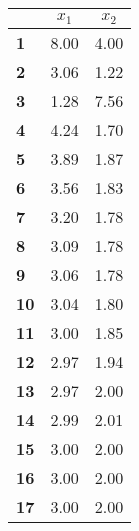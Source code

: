 \begin{small}\begin{tabular}{|l|c|c|}
\hline
&\textbf{$x_1$}&\textbf{$x_2$}\\\hline
\textbf{1}&8.00&4.00\\\hline
\textbf{2}&3.06&1.22\\\hline
\textbf{3}&1.28&7.56\\\hline
\textbf{4}&4.24&1.70\\\hline
\textbf{5}&3.89&1.87\\\hline
\textbf{6}&3.56&1.83\\\hline
\textbf{7}&3.20&1.78\\\hline
\textbf{8}&3.09&1.78\\\hline
\textbf{9}&3.06&1.78\\\hline
\textbf{10}&3.04&1.80\\\hline
\textbf{11}&3.00&1.85\\\hline
\textbf{12}&2.97&1.94\\\hline
\textbf{13}&2.97&2.00\\\hline
\textbf{14}&2.99&2.01\\\hline
\textbf{15}&3.00&2.00\\\hline
\textbf{16}&3.00&2.00\\\hline
\textbf{17}&3.00&2.00\\\hline
\end{tabular}
\end{small}